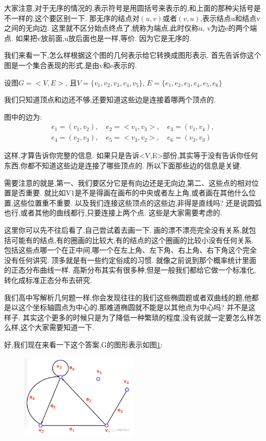大家注意,对于无序的情况的,表示符号是用圆括号来表示的,和上面的那种尖括号是不一样的,这个要区别一下. 那无序的结点对$(u,v)$或者$(v,u)$,表示结点u和结点v之间的无向边. 这里就不区分始点终点了,统称为端点,此时仅称u, v为边e的两个端点. 如果把v放前面,u放后面也是一样,等价. 因为它是无序的. 

我们来看一下,怎么样根据这个图的几何表示给它转换成图形表示. 首先告诉你这个图是一个集合表现的形式,是由v和e表示的. 

设图$G=<V, E>$, 且$V = \{v_1,v_2,v_3,v_4,v_5\}$, $E = \{e_1,e_2,e_3,e_4,e_5,e_6\}$

我们只知道顶点和边还不够,还要知道这些边是连接着哪两个顶点的. 

图中的边为:  
\begin{align*}
  e_1=(v_1,v_2), \quad e_2=<v_1,v_3>, \quad e_3=(v_1,v_4), \\ 
  e_4=(v_2,v_3), \quad e_5=<v_3,v_2>, \quad e_6=(v_3,v_3)
\end{align*}

这样,才算告诉你完整的信息. 如果只是告诉<V,E>部份,其实等于没有告诉你任何东西,你都不知道这些边是连接了哪些顶点的. 所以下面那些边的信息是关键. 

需要注意的就是,第一、我们要区分它是有向边还是无向边,第二、这些点的相对位置是否重要. 就比如V1是不是得画在画布的中央或者左上角,或者画在其他什么位置,这些位置重不重要. 以及我们连接这些顶点的这些边,非得是直线吗? 还是说圆弧也行,或者其他的曲线都行,只要连接上两个点. 这些是大家需要考虑的. 

这里你可以先不往后看了,自己尝试着去画一下. 画的漂不漂亮完全没有关系,就包括可能有的结点,有的圈画的比较大,有的结点的这个圈画的比较小没有任何关系. 包括这些点哪一个在正中间,哪一个在左上角、左下角、右上角、右下角这个完全没有任何讲究. 顶多就是有一些约定俗成的习惯. 就像之前说到那个概率统计里面的正态分布曲线一样. 高斯分布其实有很多种,但是一般我们都给它做一个标准化,转化成标准正态分布去研究. 

我们高中写解析几何题一样,你会发现往往的我们这些椭圆题或者双曲线的题,他都是以这个坐标轴圆点为中心的,那难道椭圆就不能是以其他点为中心吗? 并不是这样子. 其实这个更多的时候只是为了降低一种繁琐的程度,没有说就一定要怎么样怎么样,这个大家需要知道一下. 

好,我们现在来看一下这个答案,G的图形表示如图\ref{fig:img25_1}: 

\begin{figure}[ht]
  \centering
  \includegraphics[width=0.5\textwidth]{asset/20231227145030.png}
  \caption{}
  \label{fig:img25_1}
\end{figure}

